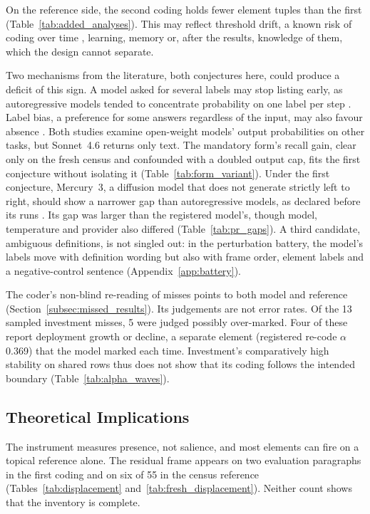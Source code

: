 On the reference side, the second coding holds fewer element tuples than the first (Table~\ref{tab:added_analyses}). This may reflect threshold drift, a known risk of coding over time \parencite[p.~565]{song2020validations}, learning, memory or, after the results, knowledge of them, which the design cannot separate.

Two mechanisms from the literature, both conjectures here, could produce a deficit of this sign. A model asked for several labels may stop listing early, as autoregressive models tended to concentrate probability on one label per step \parencite[p.~2472]{ma2025multilabel}. Label bias, a preference for some answers regardless of the input, may also favour absence \parencite{reif2024labelbias}. Both studies examine open-weight models' output probabilities on other tasks, but Sonnet~4.6 returns only text. The mandatory form's recall gain, clear only on the fresh census and confounded with a doubled output cap, fits the first conjecture without isolating it (Table~\ref{tab:form_variant}). Under the first conjecture, Mercury~3, a diffusion model that does not generate strictly left to right, should show a narrower gap than autoregressive models, as declared before its runs \parencite{inception2026mercury3,inception2025mercury}. Its gap was larger than the registered model's, though model, temperature and provider also differed (Table~\ref{tab:pr_gaps}). A third candidate, ambiguous definitions, is not singled out: in the perturbation battery, the model's labels move with definition wording but also with frame order, element labels and a negative-control sentence (Appendix~\ref{app:battery}).

The coder's non-blind re-reading of misses points to both model and reference (Section~\ref{subsec:missed_results}). Its judgements are not error rates. Of the 13 sampled investment misses, 5 were judged possibly over-marked. Four of these report deployment growth or decline, a separate element (registered re-code $\alpha$ 0.369) that the model marked each time. Investment's comparatively high stability on shared rows thus does not show that its coding follows the intended boundary (Table~\ref{tab:alpha_waves}).

\subsection{Theoretical Implications}\label{subsec:theoretical_implications}\label{subsec:implications}

The instrument measures presence, not salience, and most elements can fire on a topical reference alone. The residual frame appears on two evaluation paragraphs in the first coding and on six of 55 in the census reference (Tables~\ref{tab:displacement} and~\ref{tab:fresh_displacement}). Neither count shows that the inventory is complete.

